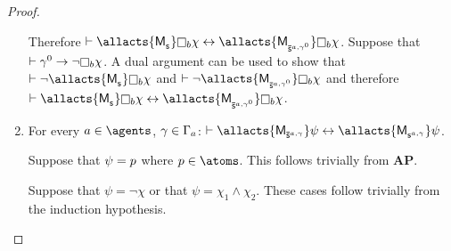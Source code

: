 \begin{proof}
\begin{enumerate}
        Therefore $\proves \allacts{\aPModel{\aStateS}} \necessary[\agentB] \chi \iff \allacts{\aPModel{\aPStateS[\agentA,\gamma^0]}} \necessary[\agentB] \chi$.
        Suppose that $\proves \gamma^0 \implies \neg \necessary[\agentB] \chi$.
        A dual argument can be used to show that $\proves \neg \allacts{\aPModel{\aStateS}} \necessary[\agentB] \chi$ and $\proves \neg \allacts{\aPModel{\aPStateS[\agentA,\gamma^0]}} \necessary[\agentB] \chi$ and therefore $\proves \allacts{\aPModel{\aStateS}} \necessary[\agentB] \chi \iff \allacts{\aPModel{\aPStateS[\agentA,\gamma^0]}} \necessary[\agentB] \chi$.

    \item For every $\agentA \in \agents$, $\gamma \in \Gamma_a$: $\proves \allacts{\aPModel{\aPStateS[\agentA,\gamma]}} \psi \iff \allacts{\aPModel{\aStateS[\agentA,\gamma]}} \psi$.

        Suppose that $\psi = p$ where $\atomP \in \atoms$. 
        This follows trivially from {\bf AP}.

        Suppose that $\psi = \neg \chi$ or that $\psi = \chi_1 \land \chi_2$. These cases follow trivially from the induction hypothesis.


\end{enumerate}
\end{proof}
